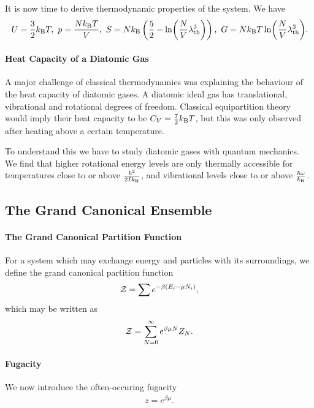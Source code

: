 It is now time to derive thermodynamic properties of the system. We have
\begin{align*}
	U = \frac{3}{2}\kb T,\ p = \frac{N\kb T}{V},\ S = N\kb\left(\frac{5}{2} - \ln(\frac{N}{V}\lambda_{\text{th}}^{3})\right),\ G = N\kb T\ln(\frac{N}{V}\lambda_{\text{th}}^{3}).
\end{align*}

\paragraph{Heat Capacity of a Diatomic Gas}
A major challenge of classical thermodynamics was explaining the behaviour of the heat capacity of diatomic gases. A diatomic ideal gas has translational, vibrational and rotational degrees of freedom. Classical equipartition theory would imply their heat capacity to be $C_{V} = \frac{7}{2}k_{\text{B}} T$, but this was only observed after heating above a certain temperature.

To understand this we have to study diatomic gases with quantum mechanics. We find that higher rotational energy levels are only thermally accessible for temperatures close to or above $\frac{\hbar^{2}}{2Ik_{\text{B}}}$, and vibrational levels close to or above $\frac{\hbar\omega}{k_{\text{B}}}$.

\subsection{The Grand Canonical Ensemble}

\paragraph{The Grand Canonical Partition Function}
For a system which may exchange energy and particles with its surroundings, we define the grand canonical partition function
\begin{align*}
	\mathcal{Z} = \sum e^{-\beta(E_{i} - \mu N_{i})},
\end{align*}
which may be written as
\begin{align*}
	\mathcal{Z} = \sum\limits_{N = 0}^{\infty}e^{\beta\mu N}Z_{N}.
\end{align*}

\paragraph{Fugacity}
We now introduce the often-occuring fugacity
\begin{align*}
	z = e^{\beta\mu}.
\end{align*}


